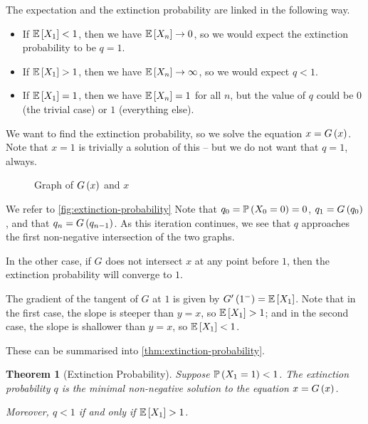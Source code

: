 \documentclass{article}
\newtheorem{theorem}{Theorem}[section]
\theoremstyle{definition}
\theoremstyle{remark}
\newcommand{\Prob}{\mathbb{P}}
\newcommand{\Expt}{\mathbb{E}}
\begin{document}
The expectation and the extinction probability are linked in the following way.

\begin{itemize}
    \item If \(\Expt\bqty{X_1} < 1\), then we have \(\Expt\bqty{X_n} \to 0\), so we would expect the extinction probability to be \(q = 1\).

    \item If \(\Expt\bqty{X_1} > 1\), then we have \(\Expt\bqty{X_n} \to \infty\), so we would expect \(q < 1\).
    
    \item If \(\Expt\bqty{X_1} = 1\), then we have \(\Expt\bqty{X_n} = 1\) for all \(n\), but the value of \(q\) could be \(0\) (the trivial case) or \(1\) (everything else).
\end{itemize}

We want to find the extinction probability, so we solve the equation \(x = G\left(x\right)\). Note that \(x = 1\) is trivially a solution of this -- but we do not want that \(q = 1\), always.

\begin{figure}[ht!]
    \centering

    \par

    \par


    \caption{Graph of \(G\left(x\right)\) and \(x\)}
    \label{fig:extinction-probability}
\end{figure}

We refer to \autoref{fig:extinction-probability} Note that \(q_0 = \Prob\pqty{X_0 = 0} = 0\), \(q_1 = G\left(q_0\right)\), and that \(q_n = G\left(q_{n - 1}\right)\). As this iteration continues, we see that \(q\) approaches the first non-negative intersection of the two graphs.

In the other case, if \(G\) does not intersect \(x\) at any point before \(1\), then the extinction probability will converge to \(1\).

The gradient of the tangent of \(G\) at \(1\) is given by \(G'\pqty{1^-} = \Expt\bqty{X_1}\). Note that in the first case, the slope is steeper than \(y = x\), so \(\Expt\bqty{X_1} > 1\); and in the second case, the slope is shallower than \(y = x\), so \(\Expt\bqty{X_1} < 1\).

These can be summarised into \autoref{thm:extinction-probability}.

\begin{theorem}[Extinction Probability]
    \label{thm:extinction-probability}%
    Suppose \(\Prob\pqty{X_1 = 1} < 1\). The extinction probability \(q\) is the minimal non-negative solution to the equation \(x = G\left(x\right)\).

    Moreover, \(q < 1\) if and only if \(\Expt\bqty{X_1} > 1\).
\end{theorem}
\end{document}
